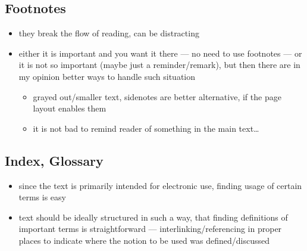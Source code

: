 \subsection{Footnotes}%
\label{sub:Footnotes}

\begin{itemize}
    \item they break the flow of reading, can be distracting
    \item either it is important and you want it there --- no need to use footnotes --- or it is not so important (maybe just a reminder/remark), but then there are in my opinion better ways to handle such situation
          \begin{itemize}
              \item grayed out/smaller text, sidenotes are better alternative, if the page layout enables them
              \item it is not bad to remind reader of something in the main text\ldots
          \end{itemize}
\end{itemize}

\subsection{Index, Glossary}%
\label{sub:Index Glossary}

\begin{itemize}
    \item since the text is primarily intended for electronic use, finding usage of certain terms is easy
    \item text should be ideally structured in such a way, that finding definitions of important terms is straightforward --- interlinking/referencing in proper places to indicate where the notion to be used was defined/discussed
\end{itemize}
